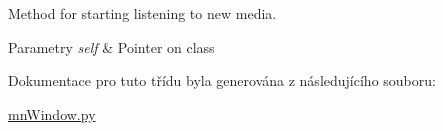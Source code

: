 Method for starting listening to new media. 


\begin{DoxyParams}{Parametry}
{\em self} & Pointer on class \\
\hline
\end{DoxyParams}


Dokumentace pro tuto třídu byla generována z následujícího souboru\-:\begin{DoxyCompactItemize}
\item 
\hyperlink{mnWindow_8py}{mn\-Window.\-py}\end{DoxyCompactItemize}
